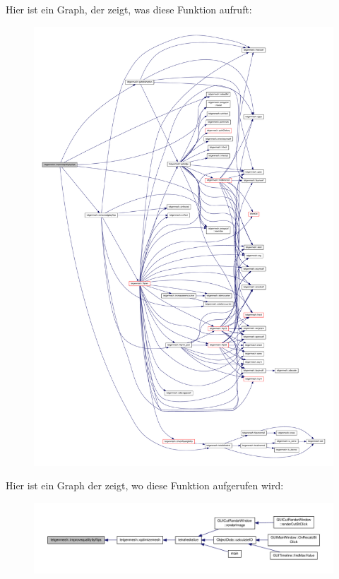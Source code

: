 Hier ist ein Graph, der zeigt, was diese Funktion aufruft\-:\nopagebreak
\begin{figure}[H]
\begin{center}
\leavevmode
\includegraphics[width=350pt]{classtetgenmesh_a3d724f195ed9c3f5e1378d1f4f0c5282_cgraph}
\end{center}
\end{figure}




Hier ist ein Graph der zeigt, wo diese Funktion aufgerufen wird\-:\nopagebreak
\begin{figure}[H]
\begin{center}
\leavevmode
\includegraphics[width=350pt]{classtetgenmesh_a3d724f195ed9c3f5e1378d1f4f0c5282_icgraph}
\end{center}
\end{figure}


